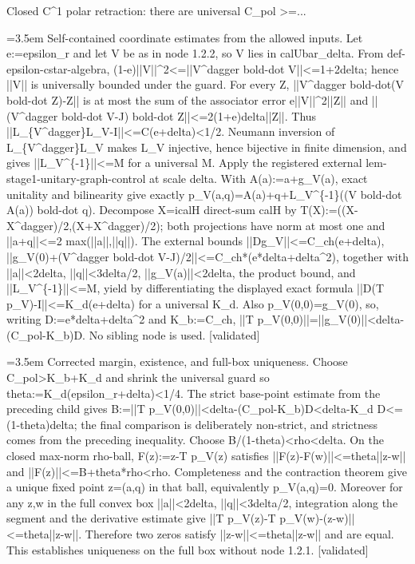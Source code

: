 \documentclass{article}
\newcommand{\step}[1]{\par\noindent\hangindent=3.5em\hangafter=1%
  \makebox[3.5em][l]{\textbf{#1.}}}
\newcommand{\steptag}[1]{\hfill{\small\textsf{[#1]}}}
\begin{document}
\begin{proofbox}{Closed C\textasciicircum{}1 polar retraction: there are universal C\_pol >=...}
\step{1.2.2.1} Self-contained coordinate estimates from the allowed inputs. Let e:=epsilon\_r and let V be as in node 1.2.2, so V lies in calUbar\_delta. From def-epsilon-cstar-algebra, (1-e)||V||\textasciicircum{}2<=||V\textasciicircum{}dagger bold-dot V||<=1+2delta; hence ||V|| is universally bounded under the guard. For every Z, ||V\textasciicircum{}dagger bold-dot(V bold-dot Z)-Z|| is at most the sum of the associator error e||V||\textasciicircum{}2||Z|| and ||(V\textasciicircum{}dagger bold-dot V-J) bold-dot Z||<=2(1+e)delta||Z||. Thus ||L\_\{V\textasciicircum{}dagger\}L\_V-I||<=C(e+delta)<1/2. Neumann inversion of L\_\{V\textasciicircum{}dagger\}L\_V makes L\_V injective, hence bijective in finite dimension, and gives ||L\_V\textasciicircum{}\{-1\}||<=M for a universal M. Apply the registered external lem-stage1-unitary-graph-control at scale delta. With A(a):=a+g\_V(a), exact unitality and bilinearity give exactly p\_V(a,q)=A(a)+q+L\_V\textasciicircum{}\{-1\}((V bold-dot A(a)) bold-dot q). Decompose X=icalH direct-sum calH by T(X):=((X-X\textasciicircum{}dagger)/2,(X+X\textasciicircum{}dagger)/2); both projections have norm at most one and ||a+q||<=2 max(||a||,||q||). The external bounds ||Dg\_V||<=C\_ch(e+delta), ||g\_V(0)+(V\textasciicircum{}dagger bold-dot V-J)/2||<=C\_ch*(e*delta+delta\textasciicircum{}2), together with ||a||<2delta, ||q||<3delta/2, ||g\_V(a)||<2delta, the product bound, and ||L\_V\textasciicircum{}\{-1\}||<=M, yield by differentiating the displayed exact formula ||D(T p\_V)-I||<=K\_d(e+delta) for a universal K\_d. Also p\_V(0,0)=g\_V(0), so, writing D:=e*delta+delta\textasciicircum{}2 and K\_b:=C\_ch, ||T p\_V(0,0)||=||g\_V(0)||<delta-(C\_pol-K\_b)D. No sibling node is used. \steptag{validated} \\[4pt]
\step{1.2.2.2} Corrected margin, existence, and full-box uniqueness. Choose C\_pol>K\_b+K\_d and shrink the universal guard so theta:=K\_d(epsilon\_r+delta)<1/4. The strict base-point estimate from the preceding child gives B:=||T p\_V(0,0)||<delta-(C\_pol-K\_b)D<delta-K\_d D<=(1-theta)delta; the final comparison is deliberately non-strict, and strictness comes from the preceding inequality. Choose B/(1-theta)<rho<delta. On the closed max-norm rho-ball, F(z):=z-T p\_V(z) satisfies ||F(z)-F(w)||<=theta||z-w|| and ||F(z)||<=B+theta*rho<rho. Completeness and the contraction theorem give a unique fixed point z=(a,q) in that ball, equivalently p\_V(a,q)=0. Moreover for any z,w in the full convex box ||a||<2delta, ||q||<3delta/2, integration along the segment and the derivative estimate give ||T p\_V(z)-T p\_V(w)-(z-w)||<=theta||z-w||. Therefore two zeros satisfy ||z-w||<=theta||z-w|| and are equal. This establishes uniqueness on the full box without node 1.2.1. \steptag{validated} \\[4pt]

\end{proofbox}
\end{document}
